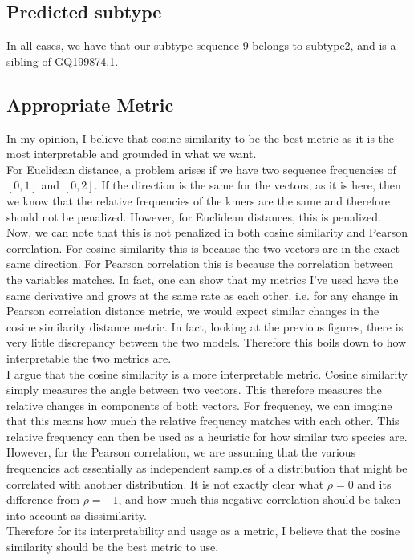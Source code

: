 \documentclass[10pt]{article}
\begin{document}
\subsection*{Predicted subtype}
In all cases, we have that our subtype sequence 9 belongs to subtype2, and is a sibling of GQ199874.1.

\subsection*{Appropriate Metric}
In my opinion, I believe that cosine similarity to be the best metric as it is the most interpretable and grounded in what we want.\\

For Euclidean distance, a problem arises if we have two sequence frequencies of $[0, 1]$ and $[0, 2]$. If the direction is the same for the vectors, as it is here, then we know that the relative frequencies of the kmers are the same and therefore should not be penalized. However, for Euclidean distances, this is penalized.\\

Now, we can note that this is not penalized in both cosine similarity and Pearson correlation. For cosine similarity this is because the two vectors are in the exact same direction. For Pearson correlation this is because the correlation between the variables matches. In fact, one can show that my metrics I've used have the same derivative and grows at the same rate as each other. i.e. for any change in Pearson correlation distance metric, we would expect similar changes in the cosine similarity distance metric. In fact, looking at the previous figures, there is very little discrepancy between the two models. Therefore this boils down to how interpretable the two metrics are.\\

I argue that the cosine similarity is a more interpretable metric. Cosine similarity simply measures the angle between two vectors. This therefore measures the relative changes in components of both vectors. For frequency, we can imagine that this means how much the relative frequency matches with each other. This relative frequency can then be used as a heuristic for how similar two species are.\\

However, for the Pearson correlation, we are assuming that the various frequencies act essentially as independent samples of a distribution that might be correlated with another distribution. It is not exactly clear what $\rho = 0$ and its difference from $\rho = -1$, and how much this negative correlation should be taken into account as dissimilarity.\\

Therefore for its interpretability and usage as a metric, I believe that the cosine similarity should be the best metric to use.
\end{document}

